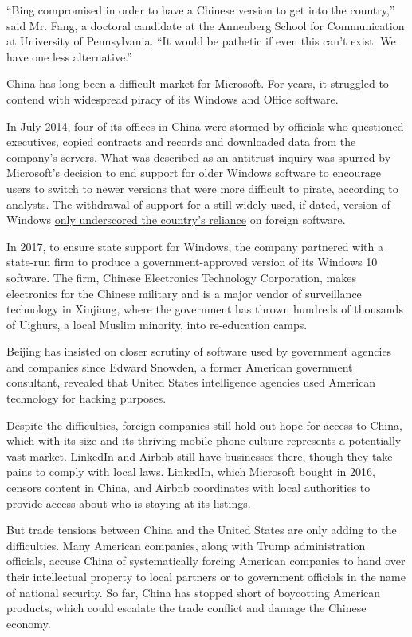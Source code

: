 ``Bing compromised in order to have a Chinese version to get into the
country,'' said Mr. Fang, a doctoral candidate at the Annenberg School
for Communication at University of Pennsylvania. ``It would be pathetic
if even this can't exist. We have one less alternative.''

China has long been a difficult market for Microsoft. For years, it
struggled to contend with widespread piracy of its Windows and Office
software.

In July 2014, four of its offices in China were stormed by officials who
questioned executives, copied contracts and records and downloaded data
from the company's servers. What was described as an antitrust inquiry
was spurred by Microsoft's decision to end support for older Windows
software to encourage users to switch to newer versions that were more
difficult to pirate, according to analysts. The withdrawal of support
for a still widely used, if dated, version of Windows
\href{https://www.nytimes3xbfgragh.onion/2016/01/06/business/international/microsoft-china-antitrust-inquiry.html}{only
underscored the country's reliance} on foreign software.

In 2017, to ensure state support for Windows, the company partnered with
a state-run firm to produce a government-approved version of its Windows
10 software. The firm, Chinese Electronics Technology Corporation, makes
electronics for the Chinese military and is a major vendor of
surveillance technology in Xinjiang, where the government has thrown
hundreds of thousands of Uighurs, a local Muslim minority, into
re-education camps.

Beijing has insisted on closer scrutiny of software used by government
agencies and companies since Edward Snowden, a former American
government consultant, revealed that United States intelligence agencies
used American technology for hacking purposes.

Despite the difficulties, foreign companies still hold out hope for
access to China, which with its size and its thriving mobile phone
culture represents a potentially vast market. LinkedIn and Airbnb still
have businesses there, though they take pains to comply with local laws.
LinkedIn, which Microsoft bought in 2016, censors content in China, and
Airbnb coordinates with local authorities to provide access about who is
staying at its listings.

But trade tensions between China and the United States are only adding
to the difficulties. Many American companies, along with Trump
administration officials, accuse China of systematically forcing
American companies to hand over their intellectual property to local
partners or to government officials in the name of national security. So
far, China has stopped short of boycotting American products, which
could escalate the trade conflict and damage the Chinese economy.

